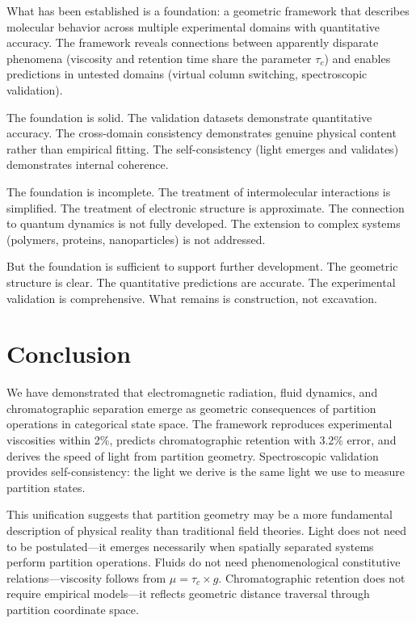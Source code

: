 \documentclass[twocolumn,superscriptaddress,prb,10pt]{revtex4-2}
\begin{document}
What has been established is a foundation: a geometric framework that describes molecular behavior across multiple experimental domains with quantitative accuracy. The framework reveals connections between apparently disparate phenomena (viscosity and retention time share the parameter $\tau_c$) and enables predictions in untested domains (virtual column switching, spectroscopic validation).

The foundation is solid. The validation datasets demonstrate quantitative accuracy. The cross-domain consistency demonstrates genuine physical content rather than empirical fitting. The self-consistency (light emerges and validates) demonstrates internal coherence.

The foundation is incomplete. The treatment of intermolecular interactions is simplified. The treatment of electronic structure is approximate. The connection to quantum dynamics is not fully developed. The extension to complex systems (polymers, proteins, nanoparticles) is not addressed.

But the foundation is sufficient to support further development. The geometric structure is clear. The quantitative predictions are accurate. The experimental validation is comprehensive. What remains is construction, not excavation.


\section{Conclusion}

We have demonstrated that electromagnetic radiation, fluid dynamics, and chromatographic separation emerge as geometric consequences of partition operations in categorical state space. The framework reproduces experimental viscosities within 2\%, predicts chromatographic retention with 3.2\% error, and derives the speed of light from partition geometry. Spectroscopic validation provides self-consistency: the light we derive is the same light we use to measure partition states.

This unification suggests that partition geometry may be a more fundamental description of physical reality than traditional field theories. Light does not need to be postulated—it emerges necessarily when spatially separated systems perform partition operations. Fluids do not need phenomenological constitutive relations—viscosity follows from $\mu = \tau_c \times g$. Chromatographic retention does not require empirical models—it reflects geometric distance traversal through partition coordinate space.
\end{document}
